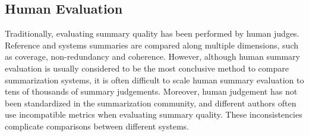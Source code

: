 \subsection{Human Evaluation}
Traditionally, evaluating summary quality has been performed by human judges. Reference and systems summaries are compared along multiple dimensions, such as coverage, non-redundancy and coherence. %
However, although human summary evaluation is usually considered to be the most conclusive method to compare summarization systems, it is often difficult to scale human summary evaluation to tens of thousands of summary judgements. Moreover, human judgement has not been standardized in the summarization community, and different authors often use incompatible metrics when evaluating summary quality. These inconsistencies complicate comparisons between different systems.

